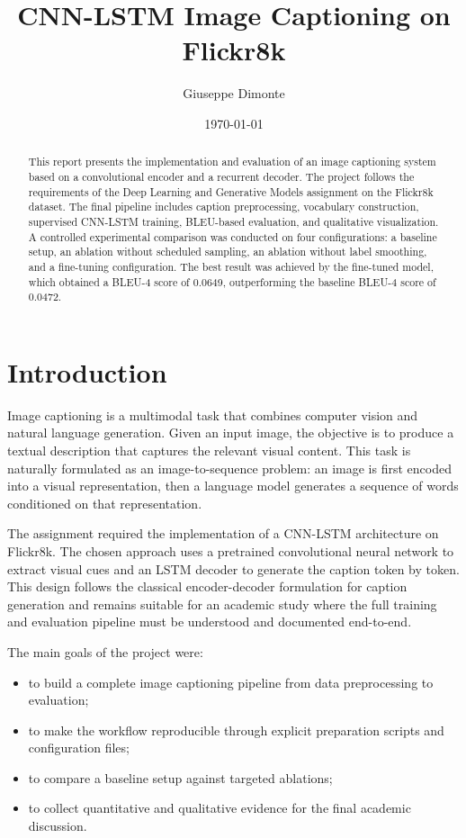 \documentclass[11pt,a4paper]{article}
\title{CNN-LSTM Image Captioning on Flickr8k}
\author{Giuseppe Dimonte}
\date{\today}
\begin{document}
\maketitle

\begin{abstract}
This report presents the implementation and evaluation of an image captioning system based on a convolutional encoder and a recurrent decoder. The project follows the requirements of the Deep Learning and Generative Models assignment on the Flickr8k dataset. The final pipeline includes caption preprocessing, vocabulary construction, supervised CNN-LSTM training, BLEU-based evaluation, and qualitative visualization. A controlled experimental comparison was conducted on four configurations: a baseline setup, an ablation without scheduled sampling, an ablation without label smoothing, and a fine-tuning configuration. The best result was achieved by the fine-tuned model, which obtained a BLEU-4 score of 0.0649, outperforming the baseline BLEU-4 score of 0.0472.
\end{abstract}

\section{Introduction}

Image captioning is a multimodal task that combines computer vision and natural language generation. Given an input image, the objective is to produce a textual description that captures the relevant visual content. This task is naturally formulated as an image-to-sequence problem: an image is first encoded into a visual representation, then a language model generates a sequence of words conditioned on that representation.

The assignment required the implementation of a CNN-LSTM architecture on Flickr8k. The chosen approach uses a pretrained convolutional neural network to extract visual cues and an LSTM decoder to generate the caption token by token. This design follows the classical encoder-decoder formulation for caption generation and remains suitable for an academic study where the full training and evaluation pipeline must be understood and documented end-to-end.

The main goals of the project were:
\begin{itemize}[leftmargin=*]
    \item to build a complete image captioning pipeline from data preprocessing to evaluation;
    \item to make the workflow reproducible through explicit preparation scripts and configuration files;
    \item to compare a baseline setup against targeted ablations;
    \item to collect quantitative and qualitative evidence for the final academic discussion.
\end{itemize}
\end{document}
